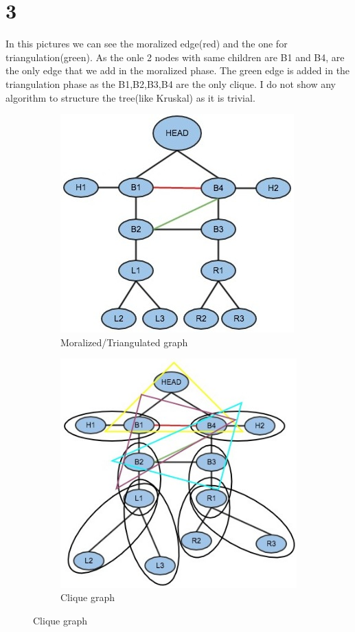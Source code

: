 \section*{3}
In this pictures we can see the moralized edge(red) and the one for
triangulation(green). As the onle 2 nodes with same children are B1 and 
B4, are the only edge that we add in the moralized phase. The green edge
is added in the triangulation phase as the B1,B2,B3,B4 are the only clique.
I do not show any algorithm to structure the tree(like Kruskal) as it is trivial.
\begin{figure}[ht]
  \begin{subfigure}[b]{0.5\linewidth}
    \centering
    \includegraphics[width=0.75\linewidth]{figures/ml5.jpg}
    \caption{Moralized/Triangulated graph}
    \vspace{4ex}
  \end{subfigure}%
  \begin{subfigure}[b]{0.5\linewidth}
    \centering
    \includegraphics[width=0.75\linewidth]{figures/ml5triang.jpg}
    \caption{Clique graph}
    \vspace{4ex}
  \end{subfigure}
\end{figure}

